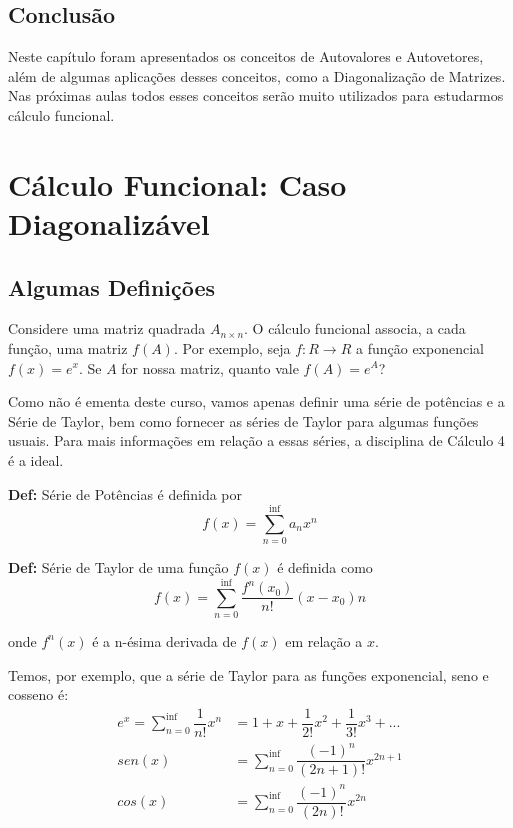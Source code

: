 \documentclass[12pt]{article}
\begin{document}
	\subsection{Conclusão}
	Neste capítulo foram apresentados os conceitos de  Autovalores e Autovetores, além de algumas aplicações desses conceitos, como a Diagonalização de Matrizes. Nas próximas aulas todos esses conceitos serão muito utilizados para estudarmos cálculo funcional. 
	
	\section{Cálculo Funcional: Caso Diagonalizável}
	
	\subsection{Algumas Definições}
	
	Considere uma matriz quadrada $A_{n\times n}$. O cálculo funcional associa, a cada função, uma matriz $f(A)$. Por exemplo, seja $f: R\rightarrow R$ a função exponencial $f(x)=e^x$. Se $A$ for nossa matriz, quanto vale $f(A)=e^A$?
	
	Como não é ementa deste curso, vamos apenas definir uma série de potências e a Série de Taylor, bem como fornecer as séries de Taylor para algumas funções usuais. Para mais informações em relação a essas séries, a disciplina de Cálculo 4 é a ideal.
	
	\textbf{Def:} Série de Potências é definida por
	\begin{equation*}
		f(x)=\sum_{n=0}^{\inf}a_{n}x^n
	\end{equation*}
	
	\textbf{Def:} Série de Taylor de uma função $f(x)$ é definida como
	\begin{equation*}
		f(x)=\sum_{n=0}^{\inf}\dfrac{f^n(x_0)}{n!}(x-x_0)n
	\end{equation*}
	
	onde $f^n(x)$ é a n-ésima derivada de $f(x)$ em relação a $x$.
	
	Temos, por exemplo, que a série de Taylor para as funções exponencial, seno e cosseno é:
	\begin{align*}
		e^x=\sum_{n=0}^{\inf}\dfrac{1}{n!}x^n&=1+x+\dfrac{1}{2!}x^2+\dfrac{1}{3!}x^3+...\\
		sen(x)&=\sum_{n=0}^{\inf}\dfrac{(-1)^n}{(2n+1)!}x^{2n+1}\\
		cos(x)&=\sum_{n=0}^{\inf}\dfrac{(-1)^n}{(2n)!}x^{2n}
	\end{align*}
	
\end{document}
